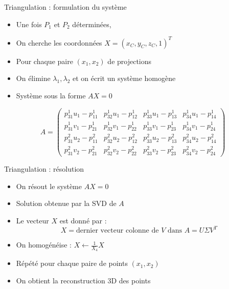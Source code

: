 \begin{frame}{Triangulation : formulation du système}
\vspace*{-0.5em}
\begin{itemize}
  \item<1-> Une fois \( P_1 \) et \( P_2 \) déterminées,
  \item<2-> On cherche les coordonnées \( X = (x_C, y_C, z_C, 1)^T \)
  \item<3-> Pour chaque paire \( (x_1, x_2) \) de projections
  \item<4-> On élimine \( \lambda_1, \lambda_2 \) et on écrit un système homogène
  \item<5-> Système sous la forme \( A X = 0 \)
\end{itemize}

\vspace{1em}

\pause
\pause
\pause
\pause
\begin{center}
\scriptsize
\[
A =
\left(
\begin{array}{cccc}
p_{31}^{1} u_1 - p_{11}^{1} & p_{32}^{1} u_1 - p_{12}^{1} & p_{33}^{1} u_1 - p_{13}^{1} & p_{34}^{1} u_1 - p_{14}^{1} \\
p_{31}^{1} v_1 - p_{21}^{1} & p_{32}^{1} v_1 - p_{22}^{1} & p_{33}^{1} v_1 - p_{23}^{1} & p_{34}^{1} v_1 - p_{24}^{1} \\
p_{31}^{2} u_2 - p_{11}^{2} & p_{32}^{2} u_2 - p_{12}^{2} & p_{33}^{2} u_2 - p_{13}^{2} & p_{34}^{2} u_2 - p_{14}^{2} \\
p_{31}^{2} v_2 - p_{21}^{2} & p_{32}^{2} v_2 - p_{22}^{2} & p_{33}^{2} v_2 - p_{23}^{2} & p_{34}^{2} v_2 - p_{24}^{2}
\end{array}
\right)
\]
\end{center}
\end{frame}

\begin{frame}{Triangulation : résolution}
\vspace*{-0.5em}
\begin{itemize}
  \item<1-> On résout le système \( A X = 0 \)
  \item<2-> Solution obtenue par la SVD de \( A \)
  \item<3-> Le vecteur \( X \) est donné par :
  \[
    X = \text{dernier vecteur colonne de } V \text{ dans } A = U \Sigma V^T
  \]
  \item<4-> On homogénéise : \( X \leftarrow \frac{1}{X_4} X \)
  \item<5-> Répété pour chaque paire de points \( (x_1, x_2) \)
  \item<6-> On obtient la reconstruction 3D des points
\end{itemize}
\end{frame}

